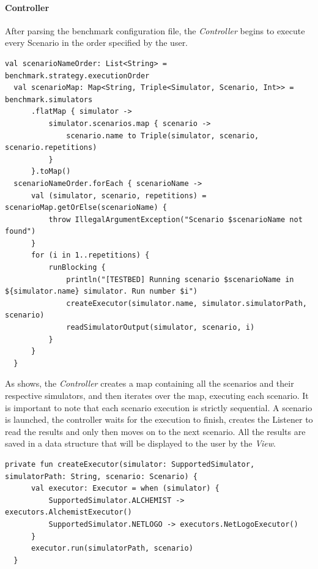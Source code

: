 \documentclass[12pt,a4paper,openright,twoside]{book}
\begin{document}
\paragraph*{Controller}

After parsing the benchmark configuration file, the \emph{Controller} begins to execute every Scenario in the order specified by the user.

\begin{lstlisting}[style=my-kotlin, language=my-kotlin, label={lst:ctrl}, caption={Controller implementation.}]
  val scenarioNameOrder: List<String> = benchmark.strategy.executionOrder
  val scenarioMap: Map<String, Triple<Simulator, Scenario, Int>> = benchmark.simulators
      .flatMap { simulator ->
          simulator.scenarios.map { scenario ->
              scenario.name to Triple(simulator, scenario, scenario.repetitions)
          }
      }.toMap()
  scenarioNameOrder.forEach { scenarioName ->
      val (simulator, scenario, repetitions) = scenarioMap.getOrElse(scenarioName) {
          throw IllegalArgumentException("Scenario $scenarioName not found")
      }
      for (i in 1..repetitions) {
          runBlocking {
              println("[TESTBED] Running scenario $scenarioName in ${simulator.name} simulator. Run number $i")
              createExecutor(simulator.name, simulator.simulatorPath, scenario)
              readSimulatorOutput(simulator, scenario, i)
          }
      }
  }
\end{lstlisting}

As  shows, the \emph{Controller} creates a map containing all the scenarios and their respective simulators, and then iterates over the map, executing each scenario.
It is important to note that each scenario execution is strictly sequential. A scenario is launched, the controller waits for the execution to finish, creates the Listener to read the results and only then moves on to the next scenario.
All the results are saved in a data structure that will be displayed to the user by the \emph{View}.

\begin{lstlisting}[style=my-kotlin, language=my-kotlin, label={lst:ctrl-executor}, caption={Controller: createExecutor method.}]
  private fun createExecutor(simulator: SupportedSimulator, simulatorPath: String, scenario: Scenario) {
      val executor: Executor = when (simulator) {
          SupportedSimulator.ALCHEMIST -> executors.AlchemistExecutor()
          SupportedSimulator.NETLOGO -> executors.NetLogoExecutor()
      }
      executor.run(simulatorPath, scenario)
  }
\end{lstlisting}
\end{document}
